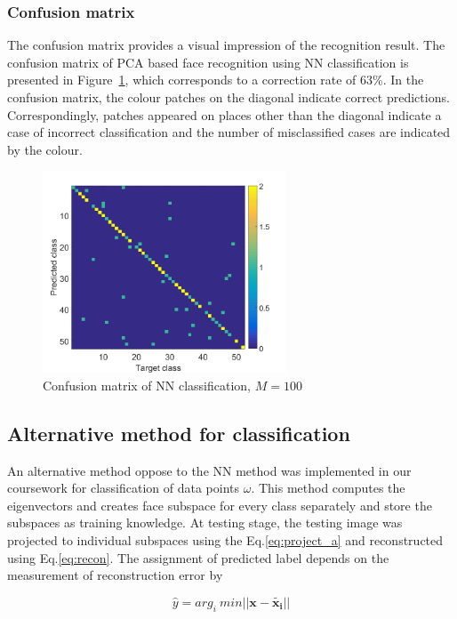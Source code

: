 \documentclass[10pt,twocolumn,letterpaper]{article}
\begin{document}
\subsubsection{Confusion matrix}
The confusion matrix provides a visual impression of the recognition result. The confusion matrix of PCA based face recognition using NN classification is presented in Figure~\ref{fig:q4_confmat_nn}, which corresponds to a correction rate of 63\%. In the confusion matrix, the colour patches on the diagonal indicate correct predictions. Correspondingly, patches appeared on places other than the diagonal indicate a case of incorrect classification and the number of misclassified cases are indicated by the colour. 

	\begin{figure}
		\begin{center}
			\includegraphics[width=0.9\linewidth, height = 6cm]{confusion_matrix_NN}
			\caption{Confusion matrix of NN classification, $M = 100$}
			\label{fig:q4_confmat_nn}
		\end{center}
	\end{figure}


\subsection{Alternative method for classification}
An alternative method oppose to the NN method was implemented in our coursework for classification of data points $\omega$. This method computes the eigenvectors and creates face subspace for every class separately and store the subspaces as training knowledge. At testing stage, the testing image was projected to individual subspaces using the Eq.\ref{eq:project_a} and reconstructed using Eq.\ref{eq:recon}. The assignment of predicted label depends on the measurement of reconstruction error by

\begin{equation}
	\hat{y} = arg_i ~ min || \boldsymbol{x} - \boldsymbol{\widetilde{x_i}}||
\end{equation}
\end{document}
